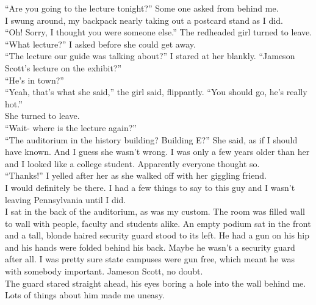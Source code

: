 \documentclass[a5paper]{scrartcl}
\begin{document}
\enquote{Are you going to the lecture tonight?} Some one asked from behind me.\\


I swung around, my backpack nearly taking out a postcard stand as I did.\\


\enquote{Oh! Sorry, I thought you were someone else.} The redheaded girl turned to leave.\\


\enquote{What lecture?} I asked before she could get away.\\


\enquote{The lecture our guide was talking about?} I stared at her blankly. \enquote{Jameson Scott's lecture on the exhibit?}\\


\enquote{He's in town?}\\


\enquote{Yeah, that's what she said,} the girl said, flippantly. \enquote{You should go, he's really hot.}\\


She turned to leave.\\


\enquote{Wait- where is the lecture again?}\\


\enquote{The auditorium in the history building? Building E?} She said, as if I should have known. And I guess she wasn't wrong. I was only a few years older than her and I looked like a college student. Apparently everyone thought so.\\


\enquote{Thanks!} I yelled after her as she walked off with her giggling friend.\\


I would definitely be there. I had a few things to say to this guy and I wasn't leaving Pennsylvania until I did.\\


I sat in the back of the auditorium, as was my custom. The room was filled wall to wall with people, faculty and students alike. An empty podium sat in the front and a tall, blonde haired security guard stood to its left. He had a gun on his hip and his hands were folded behind his back. Maybe he wasn't a security guard after all. I was pretty sure state campuses were gun free, which meant he was with somebody important. Jameson Scott, no doubt.\\


The guard stared straight ahead, his eyes boring a hole into the wall behind me. Lots of things about him made me uneasy.\\
\end{document}
